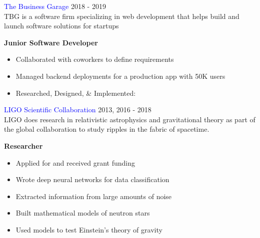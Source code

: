 \documentclass[12pt]{resume}
\begin{document}
\begin{minipage}[t]{0.48\textwidth}
        \textcolor{blue}{The Business Garage} {\hfill 2018 - 2019} \\
        TBG is a software firm specializing in web development
        that helps build and launch software solutions for startups
        \begin{spacing}{1.2}
            {\bf Junior Software Developer}
        \end{spacing}
        \vspace{-1mm}
        \begin{itemize}
            \setlength\itemsep{.2em}
            \item {Collaborated with coworkers to define requirements}
            \item {Managed backend deployments for a production app with 50K users}
            \item {Researched, Designed, \& Implemented:}
        \end{itemize}

        \vspace{1em}

        \textcolor{blue}{LIGO Scientific Collaboration} {\hfill 2013, 2016 - 2018} \\
        LIGO does research in relativistic astrophysics and gravitational
        theory as part of the global collaboration to study ripples in the
        fabric of spacetime.
        \begin{spacing}{1.2}
            {\bf Researcher}
        \end{spacing}
        \vspace{-1mm}
        \begin{itemize}
            \setlength\itemsep{.2em}
            \item {Applied for and received grant funding}
            \item {Wrote deep neural networks for data classification}
            \item {Extracted information from large amounts of noise}
            \item {Built mathematical models of neutron stars}
            \item {Used models to test Einstein’s theory of gravity}
        \end{itemize}

    \end{minipage}
\end{document}
